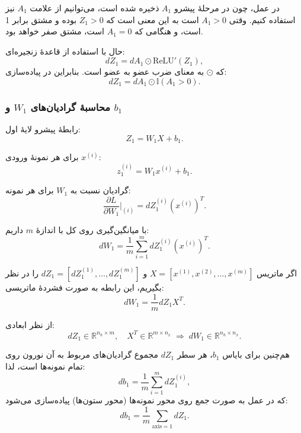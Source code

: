 \documentclass{article}
\begin{document}
در عمل، چون در مرحلهٔ پیشرو $A_1$ ذخیره شده است، می‌توانیم از علامت $A_1$ نیز استفاده کنیم. وقتی $A_1>0$ است به این معنی است که $Z_1>0$ بوده و مشتق برابر 1 است، و هنگامی که $A_1=0$ است، مشتق صفر خواهد بود. 

حال با استفاده از قاعدهٔ زنجیره‌ای:
\begin{equation}
	dZ_1 = dA_1 \odot \mathrm{ReLU}'(Z_1),
\end{equation}
که $\odot$ به معنای ضرب عضو به عضو است. بنابراین در پیاده‌سازی:
\begin{equation}
	dZ_1 = dA_1 \odot \mathbb{I}(A_1 > 0).
\end{equation}

\subsubsection{محاسبهٔ گرادیان‌های $W_1$ و $b_1$}

رابطهٔ پیشرو لایهٔ اول:
\begin{equation}
	Z_1 = W_1 X + b_1.
\end{equation}

برای هر نمونهٔ ورودی $x^{(i)}$:
\begin{equation}
	z_1^{(i)} = W_1 x^{(i)} + b_1.
\end{equation}

گرادیان نسبت به $W_1$ برای هر نمونه:
\begin{equation}
	\frac{\partial L}{\partial W_1} \bigg|_{(i)} = dZ_1^{(i)} (x^{(i)})^T.
\end{equation}

با میانگین‌گیری روی کل  با اندازهٔ $m$ داریم:
\begin{equation}
	dW_1 = \frac{1}{m} \sum_{i=1}^m dZ_1^{(i)} (x^{(i)})^T.
\end{equation}

اگر ماتریس $X = [x^{(1)}, x^{(2)}, \dots, x^{(m)}]$ و $dZ_1 = [dZ_1^{(1)}, \dots, dZ_1^{(m)}]$ را در نظر بگیریم، این رابطه به صورت فشردهٔ ماتریسی:
\begin{equation}
	dW_1 = \frac{1}{m} dZ_1 X^T.
\end{equation}

از نظر ابعادی:
\[
dZ_1 \in \mathbb{R}^{n_h \times m}, \quad
X^T \in \mathbb{R}^{m \times n_x}
\;\Rightarrow\;
dW_1 \in \mathbb{R}^{n_h \times n_x}.
\]

هم‌چنین برای بایاس $b_1$، هر سطر $dZ_1$ مجموع گرادیان‌های مربوط به آن نورون روی تمام نمونه‌ها است، لذا:
\begin{equation}
	db_1 = \frac{1}{m} \sum_{i=1}^m dZ_1^{(i)},
\end{equation}
که در عمل به صورت جمع روی محور نمونه‌ها (محور ستون‌ها) پیاده‌سازی می‌شود:
\begin{equation}
	db_1 = \frac{1}{m} \sum_{\text{axis}=1} dZ_1.
\end{equation}
\end{document}
